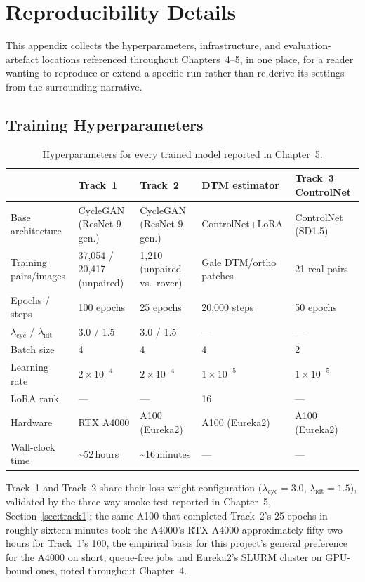 \chapter{Reproducibility Details}
\label{ch:appendix}

This appendix collects the hyperparameters, infrastructure, and evaluation-artefact locations referenced throughout Chapters~4--5, in one place, for a reader wanting to reproduce or extend a specific run rather than re-derive its settings from the surrounding narrative.

\section{Training Hyperparameters}
\label{sec:appendix-hyperparams}

\begin{table}[H]
  \caption{Hyperparameters for every trained model reported in Chapter~5.}
  \label{tab:appendix-hyperparams}
  \centering
  \small
  \begin{tabular}{p{2.6cm}p{2.6cm}p{2.6cm}p{2.6cm}p{2.6cm}}
    \toprule
    & Track~1 & Track~2 & DTM estimator & Track~3 ControlNet \\
    \midrule
    Base architecture & CycleGAN (ResNet-9 gen.) & CycleGAN (ResNet-9 gen.) & ControlNet+LoRA & ControlNet (SD1.5) \\
    Training pairs/images & 37{,}054 / 20{,}417 (unpaired) & 1{,}210 (unpaired vs.\ rover) & Gale DTM/ortho patches & 21 real pairs \\
    Epochs / steps & 100 epochs & 25 epochs & 20{,}000 steps & 50 epochs \\
    $\lambda_{\mathrm{cyc}}$ / $\lambda_{\mathrm{idt}}$ & 3.0 / 1.5 & 3.0 / 1.5 & --- & --- \\
    Batch size & 4 & 4 & 4 & 2 \\
    Learning rate & $2{\times}10^{-4}$ & $2{\times}10^{-4}$ & $1{\times}10^{-5}$ & $1{\times}10^{-5}$ \\
    LoRA rank & --- & --- & 16 & --- \\
    Hardware & RTX A4000 & A100 (Eureka2) & A100 (Eureka2) & A100 (Eureka2) \\
    Wall-clock time & \textasciitilde52\,hours & \textasciitilde16\,minutes & --- & --- \\
    \bottomrule
  \end{tabular}
\end{table}

Track~1 and Track~2 share their loss-weight configuration ($\lambda_{\mathrm{cyc}}=3.0$, $\lambda_{\mathrm{idt}}=1.5$), validated by the three-way smoke test reported in Chapter~5, Section~\ref{sec:track1}; the same A100 that completed Track~2's 25 epochs in roughly sixteen minutes took the A4000's RTX A4000 approximately fifty-two hours for Track~1's 100, the empirical basis for this project's general preference for the A4000 on short, queue-free jobs and Eureka2's SLURM cluster on GPU-bound ones, noted throughout Chapter~4.

